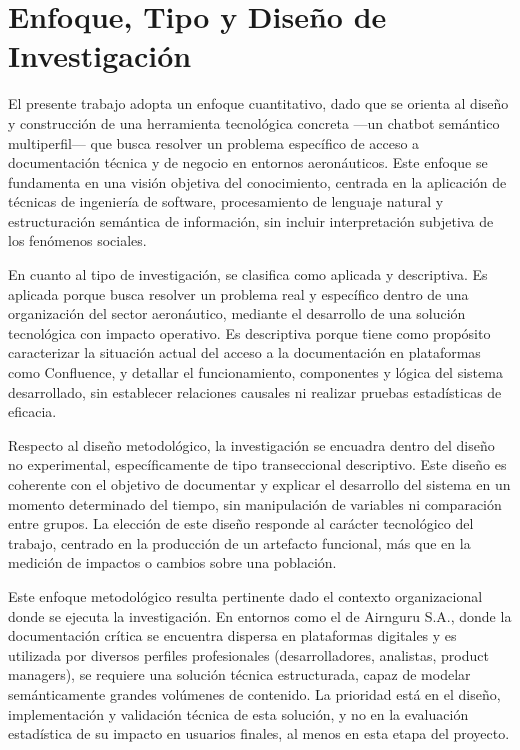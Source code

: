 \chapter{Enfoque, Tipo y Diseño de Investigación}
El presente trabajo adopta un enfoque cuantitativo, dado que se orienta al diseño y construcción de una herramienta tecnológica concreta —un chatbot semántico multiperfil— que busca resolver un problema específico de acceso a documentación técnica y de negocio en entornos aeronáuticos. Este enfoque se fundamenta en una visión objetiva del conocimiento, centrada en la aplicación de técnicas de ingeniería de software, procesamiento de lenguaje natural y estructuración semántica de información, sin incluir interpretación subjetiva de los fenómenos sociales.

En cuanto al tipo de investigación, se clasifica como aplicada y descriptiva. Es aplicada porque busca resolver un problema real y específico dentro de una organización del sector aeronáutico, mediante el desarrollo de una solución tecnológica con impacto operativo. Es descriptiva porque tiene como propósito caracterizar la situación actual del acceso a la documentación en plataformas como Confluence, y detallar el funcionamiento, componentes y lógica del sistema desarrollado, sin establecer relaciones causales ni realizar pruebas estadísticas de eficacia.

Respecto al diseño metodológico, la investigación se encuadra dentro del diseño no experimental, específicamente de tipo transeccional descriptivo. Este diseño es coherente con el objetivo de documentar y explicar el desarrollo del sistema en un momento determinado del tiempo, sin manipulación de variables ni comparación entre grupos. La elección de este diseño responde al carácter tecnológico del trabajo, centrado en la producción de un artefacto funcional, más que en la medición de impactos o cambios sobre una población.

Este enfoque metodológico resulta pertinente dado el contexto organizacional donde se ejecuta la investigación. En entornos como el de Airnguru S.A., donde la documentación crítica se encuentra dispersa en plataformas digitales y es utilizada por diversos perfiles profesionales (desarrolladores, analistas, product managers), se requiere una solución técnica estructurada, capaz de modelar semánticamente grandes volúmenes de contenido. La prioridad está en el diseño, implementación y validación técnica de esta solución, y no en la evaluación estadística de su impacto en usuarios finales, al menos en esta etapa del proyecto.